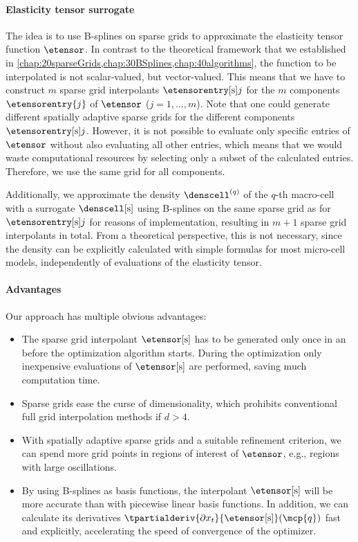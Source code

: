 \paragraph{Elasticity tensor surrogate}

The idea is to use B-splines on sparse grids to approximate
the elasticity tensor function $\etensor$.
In contrast to the theoretical framework that we established in
\cref{chap:20sparseGrids,chap:30BSplines,chap:40algorithms},
the function to be interpolated is not scalar-valued, but vector-valued.
This means that we have to construct $m$ sparse grid interpolants
$\etensorentryintp{j}$
for the $m$ components $\etensorentry{j}$ of $\etensor$ ($j = 1, \dotsc, m$).
Note that one could generate different spatially adaptive sparse grids for the
different components $\etensorentryintp{j}$.
However, it is not possible to evaluate only specific entries of $\etensor$
without also evaluating all other entries,
which means that we would waste computational resources by selecting only
a subset of the calculated entries.
Therefore, we use the same grid for all components.

Additionally, we approximate the density $\denscell^{(q)}$
of the $q$-th macro-cell with a surrogate $\denscellintp$ using
B-splines on the same sparse grid as for $\etensorentryintp{j}$
for reasons of implementation,
resulting in $m + 1$ sparse grid interpolants in total.
From a theoretical perspective, this is not necessary,
since the density can be explicitly calculated with simple formulas
for most micro-cell models, independently of evaluations of the
elasticity tensor.

\paragraph{Advantages}

Our approach has multiple obvious advantages:
\begin{itemize}
  \item
  The sparse grid interpolant $\etensorintp$ has to be generated only
  once in an  before the optimization algorithm starts.
  During the optimization 
  only inexpensive evaluations of $\etensorintp$ are performed,
  saving much computation time.
  
  \item
  Sparse grids ease the curse of dimensionality, which prohibits
  conventional full grid interpolation methods if $d > 4$.
  
  \item
  With spatially adaptive sparse grids and a suitable refinement criterion,
  we can spend more grid points in regions of interest of $\etensor$,
  e.g., regions with large oscillations.
  
  \item
  By using B-splines as basis functions,
  the interpolant $\etensorintp$ will be more accurate
  than with piecewise linear basis functions.
  In addition, we can calculate its derivatives
  $\tpartialderiv{\partialdiff{} x_t}{\etensorintp}(\mcp{q})$
  fast and explicitly,
  accelerating the speed of convergence of the optimizer.
\end{itemize}



